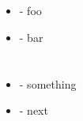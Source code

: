 \documentclass{article}
\begin{document}
\section{}
\begin{itemize}
	\item- foo
	\item- bar
\end{itemize}

\section{}
\begin{itemize}
	\item- something
	\item- next
\end{itemize}
\end{document}
